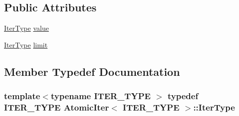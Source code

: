 \subsection*{Public Attributes}
\begin{DoxyCompactItemize}
\item 
\hyperlink{structAtomicIter_ac4cb9a13323893a58f79106c796db94a}{Iter\-Type} \hyperlink{structAtomicIter_a5820324e453911d38ae7d60005ce48b6}{value}
\item 
\hyperlink{structAtomicIter_ac4cb9a13323893a58f79106c796db94a}{Iter\-Type} \hyperlink{structAtomicIter_a500844f65141fb685bb038b4f3a070c7}{limit}
\end{DoxyCompactItemize}


\subsection{Member Typedef Documentation}
\hypertarget{structAtomicIter_ac4cb9a13323893a58f79106c796db94a}{
\subsubsection[{Iter\-Type}]{\setlength{\rightskip}{0pt plus 5cm}template$<$typename I\-T\-E\-R\-\_\-\-T\-Y\-P\-E $>$ typedef I\-T\-E\-R\-\_\-\-T\-Y\-P\-E {\bf Atomic\-Iter}$<$ I\-T\-E\-R\-\_\-\-T\-Y\-P\-E $>$\-::{\bf Iter\-Type}}}\label{structAtomicIter_ac4cb9a13323893a58f79106c796db94a}



